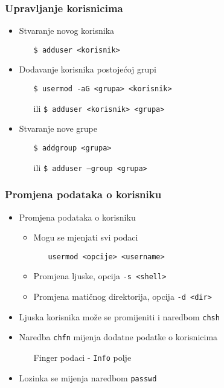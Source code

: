 \documentclass[table,usenames,dvipsnames] {beamer}
\newcommand{\shell}[1]{\texttt{#1}}
\begin{document}
\begin{frame}[t]
\frametitle{Upravljanje korisnicima}
\begin{itemize}
  \item Stvaranje novog korisnika
  \begin{itemize}
    \item[] \shell{\$ adduser <korisnik>}
  \end{itemize}
  \item Dodavanje korisnika postojećoj grupi
  \begin{itemize}
  	\item[] \shell{\$ usermod -aG <grupa> <korisnik>}
    \item[ili] \shell{\$ adduser <korisnik> <grupa>}
  \end{itemize}
  \item Stvaranje nove grupe
  \begin{itemize}
    \item[] \shell{\$ addgroup <grupa>}
    \item[ili] \shell{\$ adduser --group <grupa>}
  \end{itemize}
\end{itemize}
\end{frame}

\begin{frame}[t]
\frametitle{Promjena podataka o korisniku}
\begin{itemize}
  \item Promjena podataka o korisniku
  \begin{itemize}
    \item Mogu se mjenjati svi podaci
    \begin{itemize}
      \item[] \shell{usermod <opcije> <username>}
    \end{itemize}
    \item Promjena ljuske, opcija \shell{-s <shell>}
    \item Promjena matičnog direktorija, opcija \shell{-d <dir>}
  \end{itemize}
\end{itemize}
\begin{itemize}
  \item Ljuska korisnika može se promijeniti i  naredbom \shell{chsh}
  \item Naredba \shell{chfn} mijenja dodatne podatke o korisnicima
  \begin{itemize}
  	\item[] Finger podaci - \shell{Info} polje
  \end{itemize}
  \item Lozinka se mijenja naredbom \shell{passwd}
\end{itemize}
\end{frame}
\end{document}
